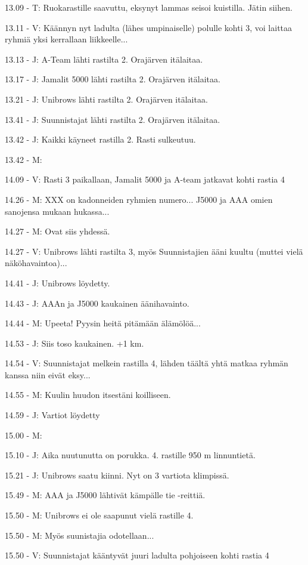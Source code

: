 \begin{multicols}{2}
13.09 - T: Ruokarastille saavuttu, eksynyt lammas seisoi kuistilla. Jätin 
siihen.

13.11 - V: Käännyn nyt ladulta (lähes umpinaiselle) polulle kohti 3, voi 
laittaa ryhmiä yksi kerrallaan liikkeelle...

13.13 - J: A-Team lähti rastilta 2. Orajärven itälaitaa.

13.17 - J: Jamalit 5000 lähti rastilta 2. Orajärven itälaitaa.

13.21 - J: Unibrows lähti rastilta 2. Orajärven itälaitaa.

13.41 - J: Suunnistajat lähti rastilta 2. Orajärven itälaitaa.

13.42 - J: Kaikki käyneet rastilla 2. Rasti sulkeutuu.

13.42 - M: {}

14.09 - V: Rasti 3 paikallaan, Jamalit 5000 ja A-team jatkavat kohti rastia 4

14.26 - M: XXX on kadonneiden ryhmien numero... J5000 ja AAA omien sanojensa 
mukaan hukassa...

14.27 - M: Ovat siis yhdessä.

14.27 - V: Unibrows lähti rastilta 3, myös Suunnistajien ääni kuultu 
(muttei vielä näköhavaintoa)...

14.41 - J: Unibrows löydetty.

14.43 - J: AAAn ja J5000 kaukainen äänihavainto.

14.44 - M: Upeeta! Pyysin heitä pitämään älämölöä...

14.53 - J: Siis toso kaukainen. +1 km.

14.54 - V: Suunnistajat melkein rastilla 4, lähden täältä yhtä matkaa 
ryhmän kanssa niin eivät eksy...

14.55 - M: Kuulin huudon itsestäni koilliseen.

14.59 - J: Vartiot löydetty

15.00 - M: {}

15.10 - J: Aika nuutunutta on porukka. 4. rastille 950 m linnuntietä.

15.21 - J: Unibrows saatu kiinni. Nyt on 3 vartiota klimpissä.

15.49 - M: AAA ja J5000 lähtivät kämpälle tie -reittiä.

15.50 - M: Unibrows ei ole saapunut vielä rastille 4.

15.50 - M: Myös suunistajia odotellaan...

15.50 - V: Suunnistajat kääntyvät juuri ladulta pohjoiseen kohti rastia 4


\end{multicols}
